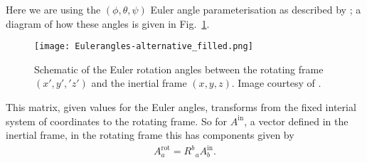 \documentclass[../full_thesis/full_thesis.tex]{subfiles}
\begin{document}
Here we are using the
$(\phi, \theta, \psi)$ Euler
angle parameterisation as described by \citet{Landau1969}; a diagram of how
these angles is given in Fig.~\ref{fig: Euler}.\begin{figure}[ht]
\centering
\texttt{[image: Eulerangles-alternative\_filled.png]}
\caption{Schematic of the Euler rotation angles between the rotating
frame $(x', y', 'z')$ and the inertial frame $(x, y, z)$. Image courtesy of
 \citet{WikipediaEuler}.}
\label{fig: Euler}
\end{figure}
This matrix, given values for the Euler angles, transforms from the fixed
interial system of coordinates to the rotating frame. So for $A^{\textrm{in}}$,
a vector defined in the inertial frame, in the rotating frame this has
components given by
\begin{align}
A^{\textrm{rot}}_{a} = R^{b}_{\;\;a} A^{\textrm{in}}_{b}.
\end{align}
\end{document}

